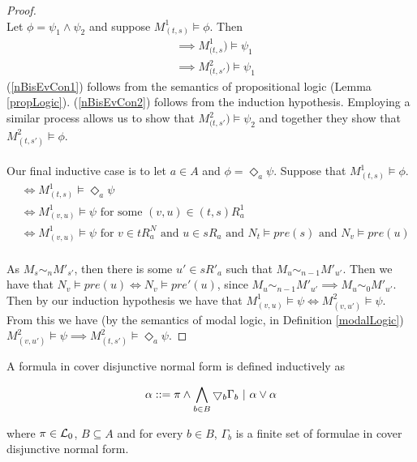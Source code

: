 \begin{proof}
\\
Let $\phi = \psi_1 \land \psi_2$ and suppose $M^1_{(t,s)} \models \phi$.
Then
\begin{align}
	& \implies M^1_{(t,s}) \models \psi_1 \label{nBisEvCon1} \\
	& \implies M^2_{(t,s'}) \models \psi_1 \label{nBisEvCon2}
\end{align}
(\ref{nBisEvCon1}) follows from the semantics of propositional logic (Lemma \ref{propLogic}).
(\ref{nBisEvCon2}) follows from the induction hypothesis.
Employing a similar process allows us to show that $M^2_{(t,s'}) \models \psi_2$ and together they 
show that $M^2_{(t,s')} \models \phi$.\\
\\
Our final inductive case is to let $a \in A$ and $\phi = \Diamond_a \psi$.
Suppose that $M^1_{(t,s)} \models \phi$.
\begin{align}
	& \iff M^1_{(t,s)} \models \Diamond_a \psi \label{nBisEvMod1} \\
	& \iff M^1_{(v,u)} \models \psi \text{ for some $(v,u) \in (t,s) R^1_a$} \label{nBisEvMod2} \\
	& \iff M^1_{(v,u)} \models \psi \text{ for $v \in t R^N_a$ and $u \in s R_a$ and $N_t \models
		pre(s)$ and $N_v \models pre(u)$} \label{nBisEvMod3} \\
\end{align}

As $M_s \sim_n M'_{s'}$, then there is some $u' \in s R'_a$ such that $M_u \sim_{n-1} M'_{u'}$.
Then we have that $N_v \models pre(u) \iff N_v \models pre'(u)$, since $M_u \sim_{n-1} M'_{u'}
\implies M_u \sim_0 M'_{u'}$.
Then by our induction hypothesis we have that $M^1_{(v,u)} \models \psi \iff M^2_{(v, u')} \models
\psi$.
From this we have (by the semantics of modal logic, in Definition \ref{modalLogic}) $M^2_{(v,u')}
\models \psi \implies M^2_{(t,s')} \models \Diamond_a \psi$.
\end{proof}


\begin{defn} \label{coverNormal}
A formula in cover disjunctive normal form is defined inductively as

\[
	\alpha ::= \pi \land \bigwedge_{b \in B} \bigtriangledown_b \Gamma_b \text{ } | \text{ } \alpha \lor \alpha
\]

where $\pi \in \mathcal{L}_0$, $B \subseteq A$ and for every $b \in B$, $\Gamma_b$ is a finite set of
formulae in cover disjunctive normal form.
\end{defn}

